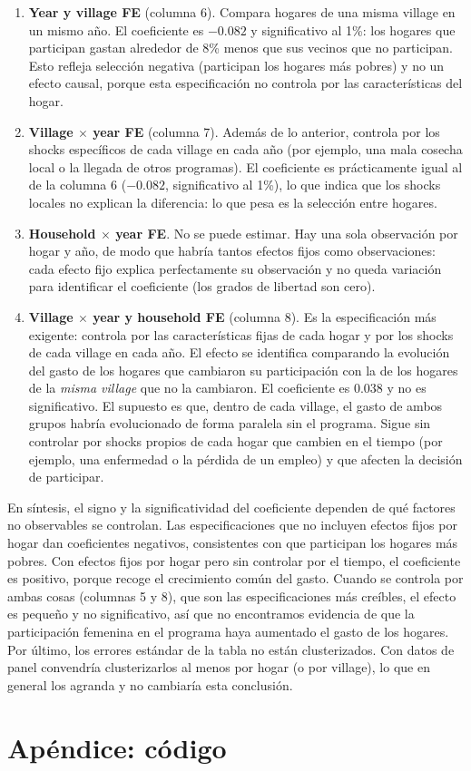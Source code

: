 \documentclass[11pt,a4paper]{article}
\begin{document}
\begin{enumerate}[label=\alph*.]
  \item \textbf{Year y village FE} (columna 6). Compara hogares de una misma village en un mismo año. El coeficiente es $-0.082$ y significativo al 1\%: los hogares que participan gastan alrededor de 8\% menos que sus vecinos que no participan. Esto refleja selección negativa (participan los hogares más pobres) y no un efecto causal, porque esta especificación no controla por las características del hogar.
  \item \textbf{Village $\times$ year FE} (columna 7). Además de lo anterior, controla por los shocks específicos de cada village en cada año (por ejemplo, una mala cosecha local o la llegada de otros programas). El coeficiente es prácticamente igual al de la columna 6 ($-0.082$, significativo al 1\%), lo que indica que los shocks locales no explican la diferencia: lo que pesa es la selección entre hogares.
  \item \textbf{Household $\times$ year FE}. No se puede estimar. Hay una sola observación por hogar y año, de modo que habría tantos efectos fijos como observaciones: cada efecto fijo explica perfectamente su observación y no queda variación para identificar el coeficiente (los grados de libertad son cero).
  \item \textbf{Village $\times$ year y household FE} (columna 8). Es la especificación más exigente: controla por las características fijas de cada hogar y por los shocks de cada village en cada año. El efecto se identifica comparando la evolución del gasto de los hogares que cambiaron su participación con la de los hogares de la \emph{misma village} que no la cambiaron. El coeficiente es 0.038 y no es significativo. El supuesto es que, dentro de cada village, el gasto de ambos grupos habría evolucionado de forma paralela sin el programa. Sigue sin controlar por shocks propios de cada hogar que cambien en el tiempo (por ejemplo, una enfermedad o la pérdida de un empleo) y que afecten la decisión de participar.
\end{enumerate}

En síntesis, el signo y la significatividad del coeficiente dependen de qué factores no observables se controlan. Las especificaciones que no incluyen efectos fijos por hogar dan coeficientes negativos, consistentes con que participan los hogares más pobres. Con efectos fijos por hogar pero sin controlar por el tiempo, el coeficiente es positivo, porque recoge el crecimiento común del gasto. Cuando se controla por ambas cosas (columnas 5 y 8), que son las especificaciones más creíbles, el efecto es pequeño y no significativo, así que no encontramos evidencia de que la participación femenina en el programa haya aumentado el gasto de los hogares. Por último, los errores estándar de la tabla no están clusterizados. Con datos de panel convendría clusterizarlos al menos por hogar (o por village), lo que en general los agranda y no cambiaría esta conclusión.

\newpage
\appendix
\section*{Apéndice: código}

\end{document}
